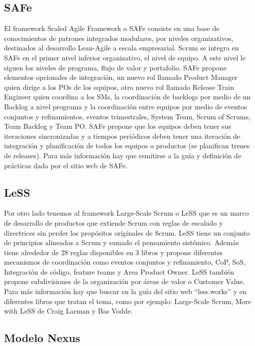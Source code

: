 \subsection{SAFe}

El framework Scaled Agile Framework o SAFe consiste en una base de conocimientos de patrones integrados modulares, por niveles organizativos, destinados al desarrollo Lean-Agile a escala empresarial. Scrum se integra en SAFe en el primer nivel inferior organizativo, el nivel de equipo. A este nivel le siguen los niveles de programa, flujo de valor y portafolio. SAFe propone elementos opcionales de integración, un nuevo rol llamado Product Manager quien dirige a los POs de los equipos, otro nuevo rol llamado Release Train Engineer quien coordina a los SMs, la coordinación de backlogs por medio de un Backlog a nivel programa y la coordinación entre equipos por medio de eventos conjuntos y refinamientos, eventos trimestrales, System Team, Scrum of Scrums, Team Backlog y Team PO. SAFe propone que los equipos deben tener sus iteraciones sincronizadas y a tiempos periódicos deben tener una iteración de integración y planificación de todos los equipos o productos  (se planifican trenes de releases). Para más información hay que remitirse a la guía y definición de prácticas dada por el sitio web de SAFe.

\subsection{LeSS}

Por otro lado tenemos al framework Large-Scale Scrum o LeSS que  es un marco de desarrollo de productos que extiende Scrum con reglas de escalado y directrices sin perder los propósitos originales de Scrum. LeSS tiene un conjunto de principios alineados a Scrum y sumado el pensamiento sistémico. Además tiene alrededor de 28 reglas disponibles en 3 libros y propone diferentes mecanismos de coordinación como eventos conjuntos y refinamiento, CoP, SoS, Integración de código, feature teams y Area Product Owner. LeSS también propone subdivisiones de la organización por áreas de valor o Customer Value. Para más información hay que buscar en la guía del sitio web “less.works” y en diferentes libros que tratan el tema, como por ejemplo: Large-Scale Scrum, More with LeSS de Craig Larman y Bas Vodde.

\subsection{Modelo Nexus}

